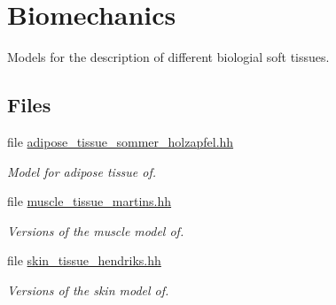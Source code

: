 \hypertarget{group__Biomechanics}{\section{\-Biomechanics}
\label{group__Biomechanics}
}


\-Models for the description of different biologial soft tissues.  


\subsection*{\-Files}
\begin{DoxyCompactItemize}
\item 
file \hyperlink{adipose__tissue__sommer__holzapfel_8hh}{adipose\-\_\-tissue\-\_\-sommer\-\_\-holzapfel.\-hh}
\begin{DoxyCompactList}\small\item\em \-Model for adipose tissue of. \end{DoxyCompactList}\item 
file \hyperlink{muscle__tissue__martins_8hh}{muscle\-\_\-tissue\-\_\-martins.\-hh}
\begin{DoxyCompactList}\small\item\em \-Versions of the muscle model of. \end{DoxyCompactList}\item 
file \hyperlink{skin__tissue__hendriks_8hh}{skin\-\_\-tissue\-\_\-hendriks.\-hh}
\begin{DoxyCompactList}\small\item\em \-Versions of the skin model of. \end{DoxyCompactList}\end{DoxyCompactItemize}
